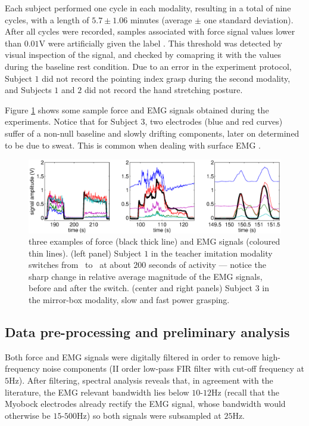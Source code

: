 Each subject performed one cycle in each modality, resulting in a total
of nine cycles, with a length of $5.7 \pm 1.06$ minutes (average
$\pm$ one standard deviation). After all cycles were recorded, samples
associated with force signal values lower than $0.01$V were artificially
given the label \re. This threshold was detected by visual inspection
of the signal, and checked by comapring it with the values during the 
baseline rest condition. Due to an error in the
experiment protocol, Subject $1$ did not record the pointing index
grasp during the second modality, and Subjects $1$ and $2$ did not
record the hand stretching posture.

Figure \ref{fig:examples} shows some sample force and EMG signals obtained
during the experiments. Notice that for Subject $3$, two electrodes (blue and
red curves) suffer of a non-null baseline and slowly drifting components,
later on determined to be due to sweat. This is common when dealing with
surface EMG \cite{deluca97,deluca02}.

\begin{figure}[!ht] \centering
  \includegraphics[width=\textwidth]{figs/figExamples}
  \caption{three examples of force (black thick line) and EMG
    signals (coloured thin lines). (left panel) Subject $1$ in the teacher imitation
    modality switches from \po\ to \pw\ at about $200$ seconds of activity --- notice
    the sharp change in relative average magnitude of the EMG signals, before and after
    the switch. (center and right panels) Subject $3$ in the mirror-box modality, slow
    and fast power grasping.}
  \label{fig:examples}
\end{figure}

\subsection{Data pre-processing and preliminary analysis}

Both force and EMG signals were digitally filtered in order
to remove high-frequency noise components (II order low-pass FIR filter
with cut-off frequency at $5$Hz). After filtering, spectral analysis
reveals that, in agreement with the literature, the EMG relevant bandwidth
lies below $10$-$12$Hz (recall that the Myobock electrodes already rectify
the EMG signal, whose bandwidth would otherwise be $15$-$500$Hz)
so both signals were subsampled at $25$Hz.

